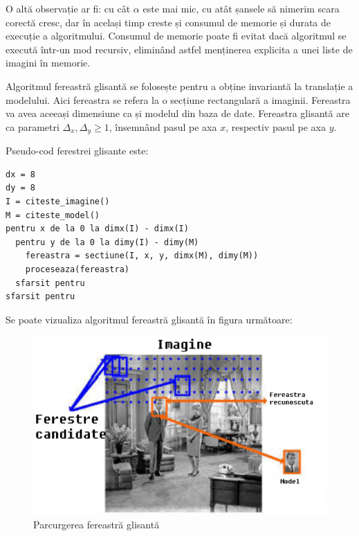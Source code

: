 O altă observație ar fi: cu cât ${\alpha}$ este mai mic, cu atât șansele să nimerim scara corectă cresc, dar în același timp creste și consumul de memorie și durata de execuție a algoritmului.
Consumul de memorie poate fi evitat dacă algoritmul se execută într-un mod recursiv, eliminând astfel menținerea explicita a unei liste de imagini în memorie.

Algoritmul fereastră glisantă se folosește pentru a obține invariantă la translație a modelului.
Aici fereastra se refera la o secțiune rectangulară a imaginii.
Fereastra va avea aceeași dimensiune ca și modelul din baza de date.
Fereastra glisantă are ca parametri ${\Delta_x, \Delta_y \geq 1}$, însemnând pasul pe axa ${x}$, respectiv pasul pe axa ${y}$.

Pseudo-cod ferestrei glisante este:
\begin{mdframed}
\begin{verbatim}
dx = 8
dy = 8
I = citeste_imagine()
M = citeste_model()
pentru x de la 0 la dimx(I) - dimx(I)
  pentru y de la 0 la dimy(I) - dimy(M)
    fereastra = sectiune(I, x, y, dimx(M), dimy(M))
    proceseaza(fereastra)
  sfarsit pentru
sfarsit pentru
\end{verbatim}
\end{mdframed}

Se poate vizualiza algoritmul fereastră glisantă în figura următoare:
\begin{figure}[H]
	\centering
		\includegraphics[width=1.00\textwidth]{imagini/sliding_window.png}
	\caption{Parcurgerea fereastră glisantă\protect\footnotemark}
	\label{fig:sliding_window}
\end{figure}



